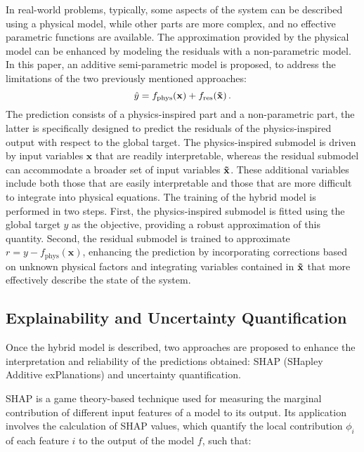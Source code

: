 \documentclass[preprint,12pt]{elsarticle}
\begin{document}
In real-world problems, typically, some aspects of the system can be described using a physical model, while other parts are more complex, and no effective parametric functions are available. The approximation provided by the physical model can be enhanced by modeling the residuals with a non-parametric model. In this paper, an additive semi-parametric model is proposed, to address the limitations of the two previously mentioned approaches:
\begin{equation}
         {\hat{y}} = f_{\text{phys}}(\mathbf{x}) + f_{\text{res}}(\mathbf{\Tilde{x}}) \, .
\end{equation}
The prediction consists of a physics-inspired part and a non-parametric part, the latter is specifically designed to predict the residuals of the physics-inspired output with respect to the global target. The physics-inspired submodel is driven by input variables $\mathbf{x}$ that are readily interpretable, whereas the residual submodel can accommodate a broader set of input variables $\mathbf{\Tilde{x}}$. These additional variables include both those that are easily interpretable and those that are more difficult to integrate into physical equations. The training of the hybrid model is performed in two steps. First, the physics-inspired submodel is fitted using the global target $y$ as the objective, providing a robust approximation of this quantity. Second, the residual submodel is trained to approximate $r = y-f_{\text{phys}}(\mathbf{x})$, enhancing the prediction by incorporating corrections based on unknown physical factors and integrating variables contained in $\mathbf{\Tilde{x}}$ that more effectively describe the state of the system. 

\subsection{Explainability and Uncertainty Quantification}

Once the hybrid model is described, two approaches are proposed to enhance the interpretation and reliability of the predictions obtained: SHAP (SHapley Additive exPlanations) and uncertainty quantification.

SHAP \cite{shap2017} is a game theory-based technique used for  measuring the marginal contribution of different input features of a model to its output. Its application involves the calculation of SHAP values, which quantify the local contribution $\phi_i$ of each feature $i$ to the output of the model $f$, such that:
\end{document}
